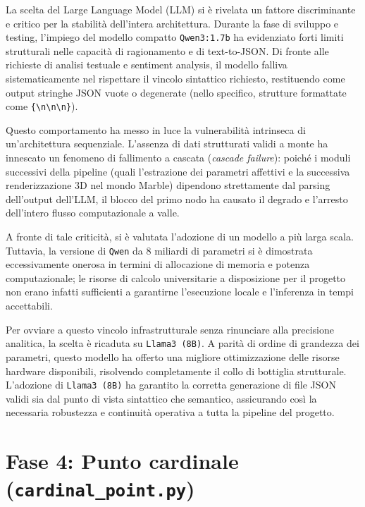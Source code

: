 \documentclass[11pt]{report}
\begin{document}
La scelta del Large Language Model (LLM) si è rivelata un fattore discriminante e critico per la stabilità dell'intera architettura. Durante la fase di sviluppo e testing, l'impiego del modello compatto \texttt{Qwen3:1.7b} ha evidenziato forti limiti strutturali nelle capacità di ragionamento e di text-to-JSON. Di fronte alle richieste di analisi testuale e sentiment analysis, il modello falliva sistematicamente nel rispettare il vincolo sintattico richiesto, restituendo come output stringhe JSON vuote o degenerate (nello specifico, strutture formattate come \texttt{\{\textbackslash n\textbackslash n\textbackslash n\}}).

Questo comportamento ha messo in luce la vulnerabilità intrinseca di un'architettura sequenziale. L'assenza di dati strutturati validi a monte ha innescato un fenomeno di fallimento a cascata (\textit{cascade failure}): poiché i moduli successivi della pipeline (quali l'estrazione dei parametri affettivi e la successiva renderizzazione 3D nel mondo Marble) dipendono strettamente dal parsing dell'output dell'LLM, il blocco del primo nodo ha causato il degrado e l'arresto dell'intero flusso computazionale a valle.

A fronte di tale criticità, si è valutata l'adozione di un modello a più larga scala. Tuttavia, la versione di \texttt{Qwen} da 8 miliardi di parametri si è dimostrata eccessivamente onerosa in termini di allocazione di memoria e potenza computazionale; le risorse di calcolo universitarie a disposizione per il progetto non erano infatti sufficienti a garantirne l'esecuzione locale e l'inferenza in tempi accettabili. 

Per ovviare a questo vincolo infrastrutturale senza rinunciare alla precisione analitica, la scelta è ricaduta su \texttt{Llama3 (8B)}. A parità di ordine di grandezza dei parametri, questo modello ha offerto una migliore ottimizzazione delle risorse hardware disponibili, risolvendo completamente il collo di bottiglia strutturale. L'adozione di \texttt{Llama3 (8B)} ha garantito la corretta generazione di file JSON validi sia dal punto di vista sintattico che semantico, assicurando così la necessaria robustezza e continuità operativa a tutta la pipeline del progetto.
 
 
\section{Fase 4: Punto cardinale (\texttt{cardinal\_point.py})}
 
\end{document}
